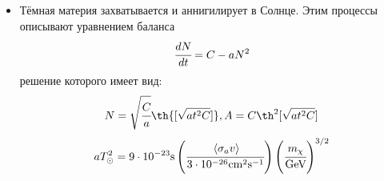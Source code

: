 \begin{itemize}
	\item Тёмная материя захватывается и аннигилирует в Солнце. Этим процессы описывают уравнением баланса 
	\begin{equation*}
		\cfrac{d N}{d t} = C - aN^2
	\end{equation*}
	решение которого имеет вид:
	\begin{equation*}
		N = \sqrt{\cfrac{C}{a}} \th{[\sqrt{at^2C}]}, 
		A = C \th^2{[\sqrt{at^2C}]}
		\label{eq:AnnNtherm}
	\end{equation*}
	\begin{equation*}
		aT_{\odot}^2 = 
		9\cdot10^{-23} \text{s}	\left(\cfrac{   \left\langle \sigma_{a}v \right\rangle    }{3\cdot10^{-26} \text{cm}^2\text{s}^{-1}} \right)
		\left(\cfrac{m_{\chi}}{\text{GeV}}\right)^{3/2}
	\end{equation*}
\end{itemize}